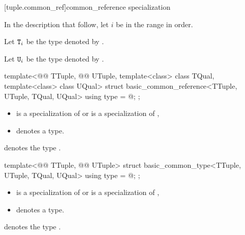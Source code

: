 \documentclass{wg21}
\begin{document}
\begin{addedblock}
[tuple.common_ref]{common_reference specialization}

\begin{addedblock}
    In the description that follow, let $i$ be in the range
     in order.
    
    Let $\texttt{T}_i$ be the type denoted by .
    
    Let $\texttt{U}_i$ be the type denoted by .
\end{addedblock}

\begin{itemdecl}
    template<@@ TTuple, @@ UTuple, template<class> class TQual, template<class> class UQual>
    struct basic_common_reference<TTuple, UTuple, TQual, UQual> {
        using type = @\seebelow@;
    };
\end{itemdecl}

\begin{itemdescr}
    \constraints
    \begin{itemize}
        \item {} is a specialization of  or  is a specialization of ,
        \item {} denotes a type.
    \end{itemize}
    
     denotes the type .
    
\end{itemdescr}

\begin{itemdecl}
    template<@@ TTuple, @@ UTuple>
    struct basic_common_type<TTuple, UTuple, TQual, UQual> {
        using type = @\seebelow@;
    };
\end{itemdecl}

\begin{itemdescr}
    \constraints
    \begin{itemize}
        \item {} is a specialization of  or  is a specialization of ,
        \item {} denotes a type.
    \end{itemize}
    
     denotes the type .
    
\end{itemdescr}
\end{addedblock}
\end{document}
